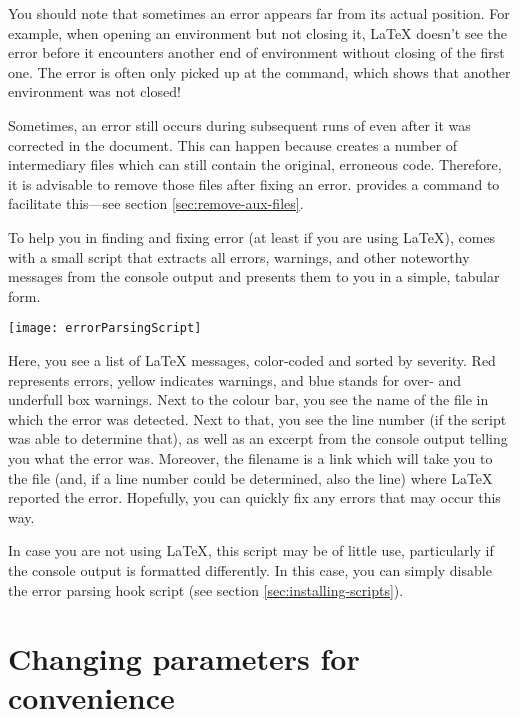 You should note that sometimes an error appears far from its actual position. For example, when opening an environment but not closing it, {\LaTeX} doesn't see the error before it encounters another end of environment without closing of the first one. The error is often only picked up at the \verb|| command, which shows that another environment was not closed!

Sometimes, an error still occurs during subsequent runs of {\AllTeX} even after it was corrected in the document. This can happen because {\AllTeX} creates a number of intermediary files which can still contain the original, erroneous code. Therefore, it is advisable to remove those files after fixing an error. {\Tw} provides a command to facilitate this---see section \ref{sec:remove-aux-files}.

To help you in finding and fixing error (at least if you are using {\LaTeX}), {\Tw} comes with a small script that extracts all errors, warnings, and other noteworthy messages from the console output and presents them to you in a simple, tabular form.

\begin{center}\label{fig:errorParsingScript}
\texttt{[image: errorParsingScript]}
\end{center}

Here, you see a list of {\LaTeX} messages, color-coded and sorted by severity. Red represents errors, yellow indicates warnings, and blue stands for over- and underfull box warnings. Next to the colour bar, you see the name of the file in which the error was detected. Next to that, you see the line number (if the script was able to determine that), as well as an excerpt from the console output telling you what the error was. Moreover, the filename is a link which will take you to the file (and, if a line number could be determined, also the line) where {\LaTeX} reported the error. Hopefully, you can quickly fix any errors that may occur this way.

In case you are not using {\LaTeX}, this script may be of little use, particularly if the console output is formatted differently. In this case, you can simply disable the error parsing hook script (see section \ref{sec:installing-scripts}).

\section{Changing {\Tw} parameters for convenience}

